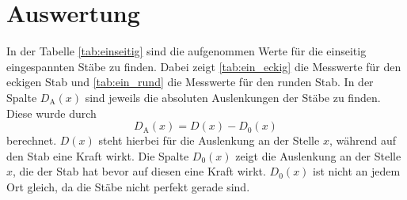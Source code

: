\section{Auswertung}
\label{sec:Auswertung}

In der Tabelle \ref{tab:einseitig} sind die aufgenommen Werte für die einseitig eingespannten Stäbe zu finden.
Dabei zeigt \ref{tab:ein_eckig} die Messwerte für den eckigen Stab und \ref{tab:ein_rund} die Messwerte für den runden Stab.
In der Spalte $D_\text{A}(x)$ sind jeweils die absoluten Auslenkungen der Stäbe zu finden.
Diese wurde durch
\begin{equation}
    D_\text{A}(x) = D(x) - D_0(x)
    \label{eqn:Da}
\end{equation}
berechnet.
$D(x)$ steht hierbei für die Auslenkung an der Stelle $x$, während auf den Stab eine Kraft wirkt.
Die Spalte $D_0(x)$ zeigt die Auslenkung an der Stelle $x$, die der Stab hat bevor auf diesen eine Kraft wirkt.
$D_0(x)$ ist nicht an jedem Ort gleich, da die Stäbe nicht perfekt gerade sind.

